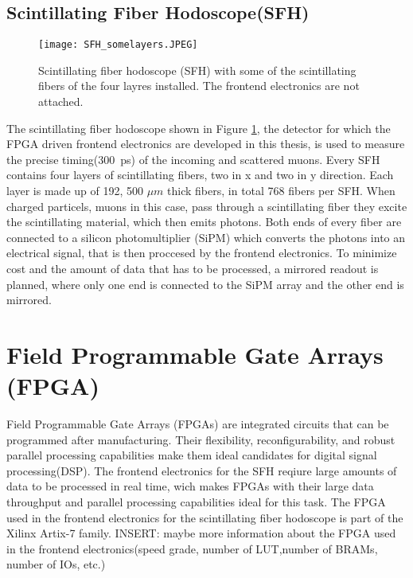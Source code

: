 \subsection{Scintillating Fiber Hodoscope(SFH)}
\begin{figure}[H]
	\centering
	\texttt{[image: SFH\_somelayers.JPEG]}
	\caption{Scintillating fiber hodoscope (SFH) with some of the scintillating fibers of the four layres installed. The frontend electronics are not attached.\autocite{InternalcommunicationKarl}}
	\label{SFHpicture}
\end{figure}
The scintillating fiber hodoscope shown in Figure \ref{SFHpicture}, 
the detector for which the FPGA driven frontend electronics are developed in this thesis,
is used to measure the precise timing(\SI{300}{\pico\second}\Autocite{Amber2022Status}) of the incoming and scattered muons. 
Every SFH contains four layers of scintillating fibers, two in x and two in y direction.
Each layer is made up of 192\autocite{Amber2022Status}, 500 $\mu m$ thick\autocite{Amber2024Status} fibers, in total 768\autocite{Amber2022Status} fibers per SFH. 
When charged particels, muons in this case, pass through a scintillating fiber they excite the scintillating material, 
which then emits photons. Both ends of every fiber are connected to a silicon photomultiplier (SiPM) which converts the photons into an electrical signal,
 that is then proccesed by the frontend electronics. To minimize cost and the amount of data that has to be processed, a mirrored readout is planned, 
 where only one end is connected to the SiPM array and the other end is mirrored.\autocite{InternalcommunicationKarl}

\section{Field Programmable Gate Arrays (FPGA)}\label{sec:FPGA}
Field Programmable Gate Arrays (FPGAs) are integrated circuits that can be programmed after manufacturing.
Their flexibility, reconfigurability, and robust parallel processing capabilities make them ideal candidates for digital signal processing(DSP).
The frontend electronics for the SFH reqiure large amounts of data to be processed in real time, wich makes FPGAs with their large data throughput and parallel processing capabilities ideal for this task.\autocite{FPGA_reviewDSP}
\newline
The FPGA used in the frontend electronics for the scintillating fiber hodoscope is part of the Xilinx Artix-7 family.\autocite{InternalcommunicationIgor}
INSERT: maybe more information about the FPGA used in the frontend electronics(speed grade, number of LUT,number of BRAMs, number of IOs, etc.)
